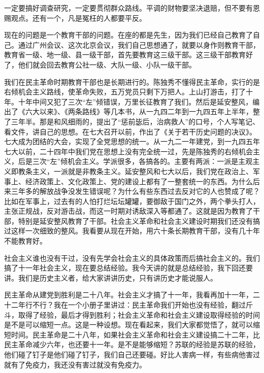 一定要搞好调查研究，一定要贯彻群众路线。平调的财物要坚决退赔，但不要有恩赐观点。还有一个，凡是冤枉的人都要平反。

现在的问题是一个教育干部的问题。在座的都是先生，因为我们已经自己教育了自己。通过广州会议、这次北京会议，我们自己思想通了，就要以身作则教育干部，教育省一级、地一级、县一级干部，首先要教育这三级干部。这三级干部教育好了，他们就会回去教育公社一级、大队一级、小队一级干部。

我们在民主革命时期教育干部也是长期进行的。陈独秀不懂得民主革命，实行的是右倾机会主义路线，使革命失败，五万党员只剩下万把人。上山打游击，打了十年。十年中间又犯了三次“左”倾错误，万里长征教育了我们。然后是延安整风，编出了《六大以来》、《两条路线》等几本书，从一九四二年到一九四五年上半年，整了三年半。那是和风细雨的，提出了“惩前毖后，治病救人”的口号，个人写笔记、看文件，讲自己的思想。在七大召开以前，作出了《关于若干历史问题的决议》。七大成为团结的大会，实现了全党思想的统一。从一九二一年建党，到一九四五年七大以前，二十四年中我们党在思想上没有完全统一过，先是陈独秀的右倾机会主义，后是三次“左”倾机会主义。学派很多，各搞各的。主要有两派：一派是主观主义即教条主义，一派就是非教条主义。延安整风和七大以后，我们党在政治上、军事上、经济政策上、文化政策上、党的建设上都有了一整套统一的东西。为什么后来三年多的解放战争没发生错误呢？为什么有些东西过去反对它的人也赞成了呢？比如在军事上，过去有的人怕打烂坛坛罐罐，要御敌于国门之外，两个拳头打人，主张正规战，反对游击战，而这一时期对诱敌深入等都通了。这就是因为教育了干部，特别是延安整风教育了干部。社会主义革命和社会主义建设时期我们还没有搞过这样一次细致的整风。我看要从现在开始，用六十条长期教育干部，没有几十年不能教育好。

社会主义谁也没有干过，没有先学会社会主义的具体政策而后搞社会主义的。我们搞了十一年社会主义，现在要总结经验。我今天讲的就是总结经验，我下回还要讲。我们是历史主义者，给大家讲讲历史，只有讲历史才能说服人。

民主革命从建党到胜利是二十八年。社会主义才搞了十一年，我看再加十一年，二十二年行不行？我在一个小册子里讲过：民主革命我们开始也没有经验，翻过斤斗，取得了经验，最后才得到胜利；社会主义革命和社会主义建设取得经验的时间是不是可以缩短一点。这是一种设想。现在看起来，我们大家都觉悟了，就可以缩短时间。民主革命是二十八年，如果社会主义革命和社会主义建设搞二十二年，比民主革命减少六年，也还要十一年。是不是能够缩短？苏联的经验是苏联的经验，他们碰了钉子是他们碰了钉子，我们自己还要碰。好比人害病一样，有些病他害过就有了免疫力，我还没有害过就没有免疫力。

